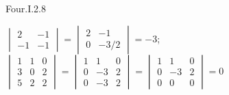 \begin{ans}{Four.I.2.8}
     \begin{exparts*}
      \partsitem \(
        \begin{vmatrix}
                 2  &-1  \\
                 -1 &-1
               \end{vmatrix}
             =\begin{vmatrix}
                 2  &-1  \\
                 0  &-3/2
               \end{vmatrix}=-3  \);
      \partsitem \( \begin{vmatrix}
                 1  &1  &0  \\
                 3  &0  &2  \\
                 5  &2  &2
               \end{vmatrix}
              =\begin{vmatrix}
                 1  &1  &0  \\
                 0  &-3 &2  \\
                 0  &-3 &2
               \end{vmatrix}
              =\begin{vmatrix}
                 1  &1  &0  \\
                 0  &-3 &2  \\
                 0  &0  &0
               \end{vmatrix}
              =0 \)
     \end{exparts*}
    
\end{ans}
